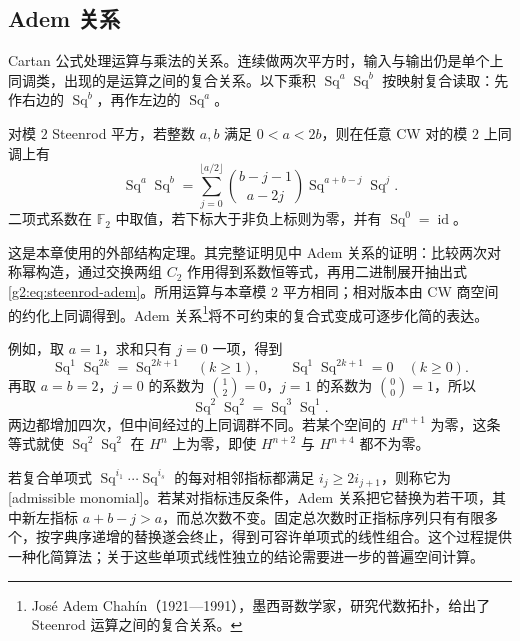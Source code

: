 \subsection{Adem 关系}
\label{g2:subsec:1303:03}

Cartan 公式处理运算与乘法的关系。连续做两次平方时，输入与输出仍是单个上同调类，出现的是运算之间的复合关系。以下乘积 \(\operatorname{Sq}^a\operatorname{Sq}^b\) 按映射复合读取：先作右边的 \(\operatorname{Sq}^b\)，再作左边的 \(\operatorname{Sq}^a\)。

\begin{theorem}[Adem 关系]\label{g2:thm:steenrod-adem}
	对模 \(2\) Steenrod 平方，若整数 \(a,b\) 满足 \(0<a<2b\)，则在任意 CW 对的模 \(2\) 上同调上有
	\begin{equation}\label{g2:eq:steenrod-adem}
		\operatorname{Sq}^a\operatorname{Sq}^b
		=\sum_{j=0}^{\lfloor a/2\rfloor}
		\binom{b-j-1}{a-2j}\operatorname{Sq}^{a+b-j}\operatorname{Sq}^j.
	\end{equation}
	二项式系数在 \(\mathbb F_2\) 中取值，若下标大于非负上标则为零，并有 \(\operatorname{Sq}^0=\operatorname{id}\)。
\end{theorem}

这是本章使用的外部结构定理。其完整证明见\cite[第4.L节，Steenrod Squares and Powers]{Hatcher2002}中 Adem 关系的证明：比较两次对称幂构造，通过交换两组 \(C_2\) 作用得到系数恒等式，再用二进制展开抽出式\eqref{g2:eq:steenrod-adem}。所用运算与本章模 \(2\) 平方相同；相对版本由 CW 商空间的约化上同调得到。Adem 关系\footnote{José Adem Chahín（1921—1991），墨西哥数学家，研究代数拓扑，给出了 Steenrod 运算之间的复合关系。}将不可约束的复合式变成可逐步化简的表达。

\ProseParagraphBreak

例如，取 \(a=1\)，求和只有 \(j=0\) 一项，得到
\[
	\operatorname{Sq}^1\operatorname{Sq}^{2k}=\operatorname{Sq}^{2k+1}\quad(k\ge1),
	\qquad \operatorname{Sq}^1\operatorname{Sq}^{2k+1}=0\quad(k\ge0).
\]
再取 \(a=b=2\)，\(j=0\) 的系数为 \(\binom12=0\)，\(j=1\) 的系数为 \(\binom00=1\)，所以
\[
	\operatorname{Sq}^2\operatorname{Sq}^2=\operatorname{Sq}^3\operatorname{Sq}^1.
\]
两边都增加四次，但中间经过的上同调群不同。若某个空间的 \(H^{n+1}\) 为零，这条等式就使 \(\operatorname{Sq}^2\operatorname{Sq}^2\) 在 \(H^n\) 上为零，即使 \(H^{n+2}\) 与 \(H^{n+4}\) 都不为零。

\ProseParagraphBreak

若复合单项式 \(\operatorname{Sq}^{i_1}\cdots\operatorname{Sq}^{i_s}\) 的每对相邻指标都满足 \(i_j\ge2i_{j+1}\)，则称它为[admissible monomial]。若某对指标违反条件，Adem 关系把它替换为若干项，其中新左指标 \(a+b-j>a\)，而总次数不变。固定总次数时正指标序列只有有限多个，按字典序递增的替换遂会终止，得到可容许单项式的线性组合。这个过程提供一种化简算法；关于这些单项式线性独立的结论需要进一步的普遍空间计算。

